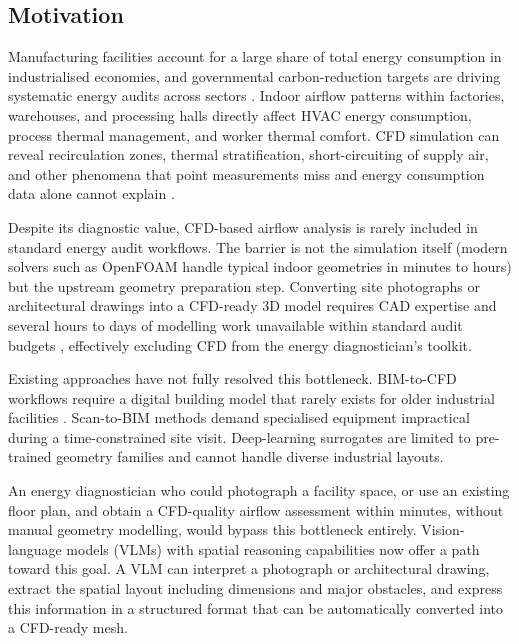 \documentclass[preprint,12pt,number]{elsarticle}
\begin{document}
\subsection{Motivation}
\label{sec:motivation}


Manufacturing facilities account for a large share of total energy consumption in industrialised economies, and governmental carbon-reduction targets are driving systematic energy audits across sectors \cite{gourlis.kovacic2017BuildingInformation,zhao.etal2021IndustrialReheating}. Indoor airflow patterns within factories, warehouses, and processing halls directly affect HVAC energy consumption, process thermal management, and worker thermal comfort. CFD simulation can reveal recirculation zones, thermal stratification, short-circuiting of supply air, and other phenomena that point measurements miss and energy consumption data alone cannot explain \cite{vuorinen.etal2020ModellingAerosol,liu.etal2019ReviewCFD}.

Despite its diagnostic value, CFD-based airflow analysis is rarely included in standard energy audit workflows. The barrier is not the simulation itself (modern solvers such as OpenFOAM \cite{weller.etal1998TensorialApproach} handle typical indoor geometries in minutes to hours) but the upstream geometry preparation step. Converting site photographs or architectural drawings into a CFD-ready 3D model requires CAD expertise and several hours to days of modelling work unavailable within standard audit budgets \cite{calzolari.liu2021DeepLearning}, effectively excluding CFD from the energy diagnostician's toolkit.

Existing approaches have not fully resolved this bottleneck. BIM-to-CFD workflows \cite{utkucu.sozer2020InteroperabilityData,weerasuriya.etal2019HolisticFramework,hou.etal2022PredictionOptimization} require a digital building model that rarely exists for older industrial facilities \cite{gourlis.kovacic2017BuildingInformation}. Scan-to-BIM methods \cite{rocha.etal2020ScantoBIMMethodology} demand specialised equipment impractical during a time-constrained site visit. Deep-learning surrogates \cite{guo.etal2016ConvolutionalNeural,calzolari.liu2021DeepLearning,kastner.dogan2023GANBasedSurrogate} are limited to pre-trained geometry families and cannot handle diverse industrial layouts.

An energy diagnostician who could photograph a facility space, or use an existing floor plan, and obtain a CFD-quality airflow assessment within minutes, without manual geometry modelling, would bypass this bottleneck entirely. Vision-language models (VLMs) with spatial reasoning capabilities \cite{openai.etal2023GPT4Technical,geminiteam.etal2023GeminiFamily,chen.etal2024SpatialVLMEndowing,hong.etal20233DLLMInjecting} now offer a path toward this goal. A VLM can interpret a photograph or architectural drawing, extract the spatial layout including dimensions and major obstacles, and express this information in a structured format that can be automatically converted into a CFD-ready mesh.
\end{document}
